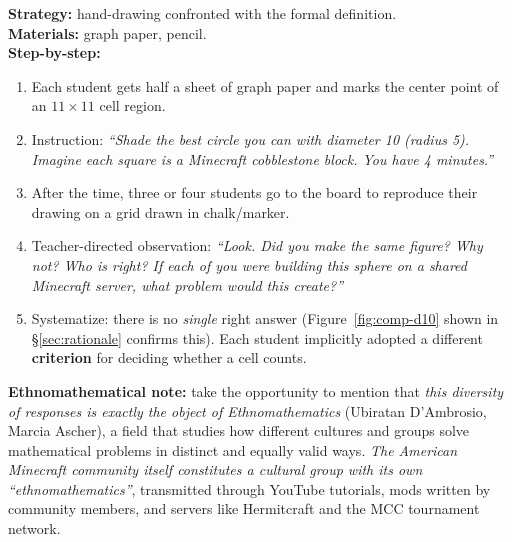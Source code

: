 \documentclass[12pt,a4paper]{scrartcl}
\newcommand{\acc}[1]{\textcolor{accent}{\textbf{#1}}}
\newcommand{\timetag}[1]{\textnormal{\footnotesize\color{bg!90!white}\textsf{#1}}}
\begin{document}
\begin{activity}[1.2 --- Problematization \quad\timetag{15 min}]
\textbf{Strategy:} hand-drawing confronted with the formal definition. \\[0.4em]
\textbf{Materials:} graph paper, pencil. \\[0.4em]
\textbf{Step-by-step:}
\begin{enumerate}[leftmargin=1.5em,itemsep=0.2em,topsep=0.3em,nosep]
  \item Each student gets half a sheet of graph paper and marks the center point of an $11 \times 11$ cell region.
  \item Instruction: \emph{\enquote{Shade the best circle you can with diameter 10 (radius 5). \emph{Imagine each square is a Minecraft cobblestone block.} You have 4 minutes.}}
  \item After the time, three or four students go to the board to reproduce their drawing on a grid drawn in chalk/marker.
  \item Teacher-directed observation: \emph{\enquote{Look. Did you make the same figure? Why not? Who is right? If each of you were building this sphere on a shared Minecraft server, what problem would this create?}}
  \item Systematize: there is no \emph{single} right answer (Figure~\ref{fig:comp-d10} shown in §\ref{sec:rationale} confirms this). Each student implicitly adopted a different \acc{criterion} for deciding whether a cell counts.
\end{enumerate}

\textbf{Ethnomathematical note:} take the opportunity to mention that \emph{this diversity of responses is exactly the object of Ethnomathematics} (Ubiratan D'Ambrosio, Marcia Ascher), a field that studies how different cultures and groups solve mathematical problems in distinct and equally valid ways. \emph{The American Minecraft community itself constitutes a cultural group with its own \enquote{ethnomathematics}}, transmitted through YouTube tutorials, mods written by community members, and servers like Hermitcraft and the MCC tournament network.
\end{activity}
\end{document}
